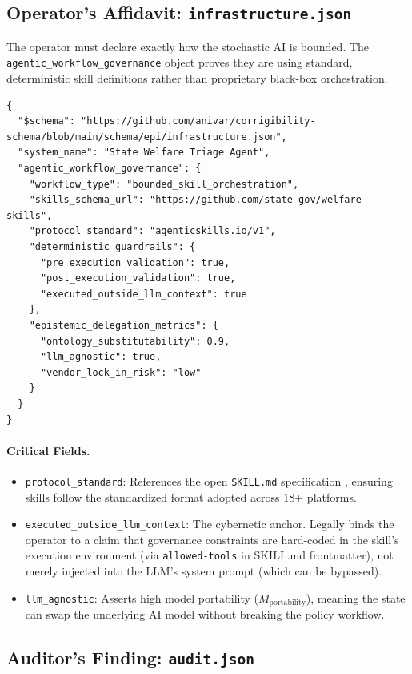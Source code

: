 \documentclass[11pt,a4paper]{article}
\theoremstyle{definition}
\begin{document}
\subsection{Operator's Affidavit: \texttt{infrastructure.json}}

The operator must declare exactly how the stochastic AI is bounded. The \texttt{agentic\_workflow\_governance} object proves they are using standard, deterministic skill definitions rather than proprietary black-box orchestration.

\begin{verbatim}
{
  "$schema": "https://github.com/anivar/corrigibility-schema/blob/main/schema/epi/infrastructure.json",
  "system_name": "State Welfare Triage Agent",
  "agentic_workflow_governance": {
    "workflow_type": "bounded_skill_orchestration",
    "skills_schema_url": "https://github.com/state-gov/welfare-skills",
    "protocol_standard": "agenticskills.io/v1",
    "deterministic_guardrails": {
      "pre_execution_validation": true,
      "post_execution_validation": true,
      "executed_outside_llm_context": true
    },
    "epistemic_delegation_metrics": {
      "ontology_substitutability": 0.9,
      "llm_agnostic": true,
      "vendor_lock_in_risk": "low"
    }
  }
}
\end{verbatim}

\paragraph{Critical Fields.}
\begin{itemize}[noitemsep]
    \item \texttt{protocol\_standard}: References the open \texttt{SKILL.md} specification \citep{agentskills2025}, ensuring skills follow the standardized format adopted across 18+ platforms.
    \item \texttt{executed\_outside\_llm\_context}: The cybernetic anchor. Legally binds the operator to a claim that governance constraints are hard-coded in the skill's execution environment (via \texttt{allowed-tools} in SKILL.md frontmatter), not merely injected into the LLM's system prompt (which can be bypassed).
    \item \texttt{llm\_agnostic}: Asserts high model portability ($M_{\text{portability}}$), meaning the state can swap the underlying AI model without breaking the policy workflow.
\end{itemize}

\subsection{Auditor's Finding: \texttt{audit.json}}
\end{document}
